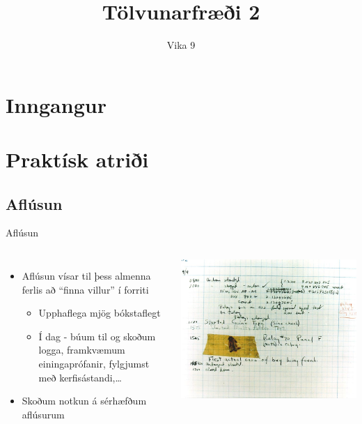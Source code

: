 \documentclass{beamer}
\title{Tölvunarfræði 2}
\subtitle{Vika 9}
\begin{document}
\begin{frame}
	\titlepage
\end{frame}

\section{Inngangur}

\section{Praktísk atriði}

\subsection{Aflúsun}

\begin{frame}{Aflúsun}
	\begin{columns}
		\begin{itemize}
			\item Aflúsun  vísar til þess almenna ferlis að ``finna villur'' í forriti
			      \begin{itemize}
				      \item Upphaflega mjög bókstaflegt
				      \item Í dag - búum til og skoðum logga, framkvæmum einingaprófanir, fylgjumst með kerfisástandi,\ldots
			      \end{itemize}
			\item Skoðum notkun á sérhæfðum aflúsurum 
		\end{itemize}
		\begin{center}
			\includegraphics[width=\textwidth]{../T1a/Pics/first-bug}
		\end{center}
	\end{columns}
\end{frame}
\end{document}

